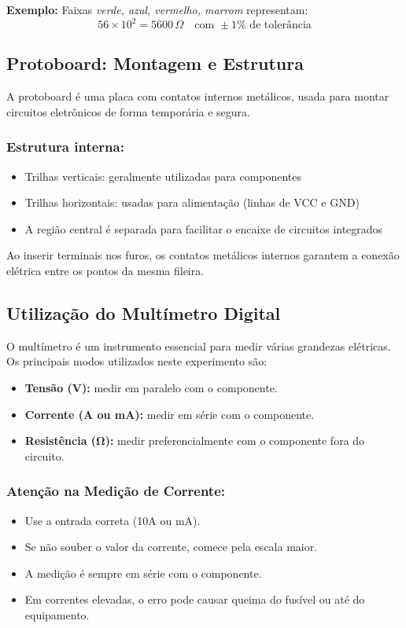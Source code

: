 \textbf{Exemplo:} Faixas \textit{verde, azul, vermelho, marrom} representam:
\[
56 \times 10^2 = 5600\,\Omega \quad \text{com } \pm1\% \text{ de tolerância}
\]

\subsection{Protoboard: Montagem e Estrutura}
A protoboard é uma placa com contatos internos metálicos, usada para montar circuitos eletrônicos de forma temporária e segura.

\subsubsection{Estrutura interna:}
\begin{itemize}
    \item Trilhas verticais: geralmente utilizadas para componentes
    \item Trilhas horizontais: usadas para alimentação (linhas de VCC e GND)
    \item A região central é separada para facilitar o encaixe de circuitos integrados
\end{itemize}

Ao inserir terminais nos furos, os contatos metálicos internos garantem a conexão elétrica entre os pontos da mesma fileira.

\subsection{Utilização do Multímetro Digital}
O multímetro é um instrumento essencial para medir várias grandezas elétricas. Os principais modos utilizados neste experimento são:

\begin{itemize}
    \item \textbf{Tensão (V):} medir em paralelo com o componente.
    \item \textbf{Corrente (A ou mA):} medir em série com o componente.
    \item \textbf{Resistência (Ω):} medir preferencialmente com o componente fora do circuito.
\end{itemize}

\subsubsection{Atenção na Medição de Corrente:}
\begin{itemize}
    \item Use a entrada correta (10A ou mA).
    \item Se não souber o valor da corrente, comece pela escala maior.
    \item A medição é sempre em série com o componente.
    \item Em correntes elevadas, o erro pode causar queima do fusível ou até do equipamento.
\end{itemize}

